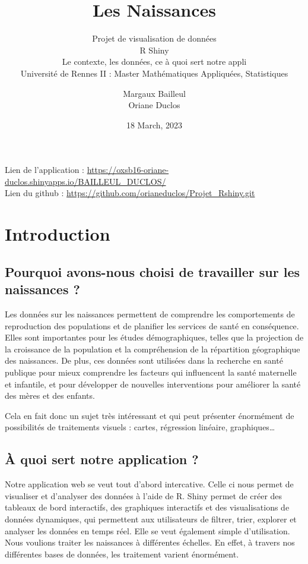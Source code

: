 \documentclass[
]{article}
\title{Les Naissances}
\subtitle{Projet de visualisation de données\\
R Shiny\\
Le contexte, les données, ce à quoi sert notre appli\\
Université de Rennes II : Master Mathématiques Appliquées, Statistiques}
\author{Margaux Bailleul\\
Oriane Duclos}
\date{18 March, 2023}
\begin{document}
\maketitle

{
\setcounter{tocdepth}{2}
\tableofcontents
}
Lien de l'application :
\url{https://oxsb16-oriane-duclos.shinyapps.io/BAILLEUL_DUCLOS/}\\
Lien du github : \url{https://github.com/orianeduclos/Projet_Rshiny.git}

\hypertarget{introduction}{%
\section{Introduction}\label{introduction}}

\hypertarget{pourquoi-avons-nous-choisi-de-travailler-sur-les-naissances}{%
\subsection{Pourquoi avons-nous choisi de travailler sur les naissances
?}\label{pourquoi-avons-nous-choisi-de-travailler-sur-les-naissances}}

Les données sur les naissances permettent de comprendre les
comportements de reproduction des populations et de planifier les
services de santé en conséquence. Elles sont importantes pour les études
démographiques, telles que la projection de la croissance de la
population et la compréhension de la répartition géographique des
naissances. De plus, ces données sont utilisées dans la recherche en
santé publique pour mieux comprendre les facteurs qui influencent la
santé maternelle et infantile, et pour développer de nouvelles
interventions pour améliorer la santé des mères et des enfants.

Cela en fait donc un sujet très intéressant et qui peut présenter
énormément de possibilités de traitements visuels : cartes, régression
linéaire, graphiques\ldots{}

\hypertarget{uxe0-quoi-sert-notre-application}{%
\subsection{À quoi sert notre application
?}\label{uxe0-quoi-sert-notre-application}}

Notre application web se veut tout d'abord intercative. Celle ci nous
permet de visualiser et d'analyser des données à l'aide de R. Shiny
permet de créer des tableaux de bord interactifs, des graphiques
interactifs et des visualisations de données dynamiques, qui permettent
aux utilisateurs de filtrer, trier, explorer et analyser les données en
temps réel. Elle se veut également simple d'utilisation. Nous voulions
traiter les naissances à différentes échelles. En effet, à travers nos
différentes bases de données, les traitement varient énormément.
\end{document}
